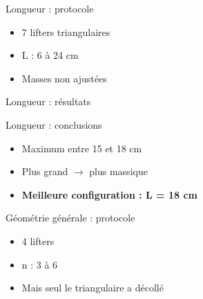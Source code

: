 \documentclass{beamer}
\begin{document}
	\begin{frame}{Longueur : protocole}
		\begin{itemize}
			\item 7 lifters triangulaires
			\item L : 6 à 24 cm
			\item Masses non ajustées
		\end{itemize}
	\end{frame}

	\begin{frame}{Longueur : résultats}
	\end{frame}

	\begin{frame}{Longueur : conclusions}
		\begin{itemize}
			\item Maximum entre 15 et 18 cm
			\item Plus grand $\longrightarrow$ plus massique
			\item \textbf{Meilleure configuration : L = 18 cm}
		\end{itemize}
	\end{frame}

	\begin{frame}{Géométrie générale : protocole}
		\begin{itemize}
			\item 4 lifters
			\item n : 3 à 6
			\item Mais seul le triangulaire a décollé
		\end{itemize}
	\end{frame}
\end{document}
